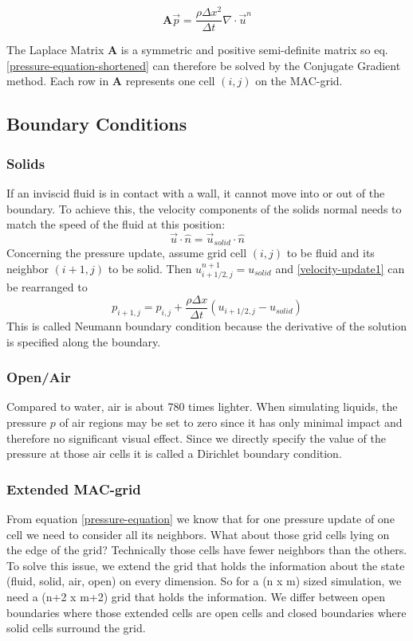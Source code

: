\begin{equation} \label{pressure-equation-shortened}
	\mathbf{A}\vec{p} = \frac{\rho \Delta x^2}{\Delta t}\nabla \cdot \vec{u}^n
\end{equation}

The Laplace Matrix $\mathbf{A}$ is a symmetric and positive semi-definite matrix so eq. \ref{pressure-equation-shortened} can therefore be solved by the Conjugate Gradient method. Each row in \textbf{A} represents one cell $(i, j)$ on the MAC-grid. 


\subsection{Boundary Conditions}
\subsubsection{Solids}
If an inviscid fluid is in contact with a wall, it cannot move into or out of the boundary. To achieve this, the velocity components of the solids normal needs to match the speed of the fluid at this position:
\begin{equation} \label{solid-velocity}
    \vec{u} \cdot \hat{n} = \vec{u}_{solid} \cdot \hat{n}
\end{equation}
Concerning the pressure update, assume grid cell $(i,j)$ to be fluid and its neighbor $(i+1,j)$ to be solid. Then $u_{i+1/2,j}^{n+1} = u_{solid}$ and \ref{velocity-update1} can be rearranged to 
\begin{equation} \label{solid-pressure-update}
    p_{i+1,j} = p_{i,j} + \frac{\rho \Delta x}{\Delta t} (u_{i+1/2,j} - u_{solid})
\end{equation}
This is called Neumann boundary condition because the derivative of the solution is specified along the boundary.
\newpage
\subsubsection{Open/Air} \label{dirichlet}
Compared to water, air is about 780 times lighter. When simulating liquids, the pressure $p$ of air regions may be set to zero since it has only minimal impact and therefore no significant visual effect. Since we directly specify the value of the pressure at those air cells it is called a Dirichlet boundary condition.


\subsubsection{Extended MAC-grid}
From equation \ref{pressure-equation} we know that for one pressure update of one cell we need to consider all its neighbors. What about those grid cells lying on the edge of the grid? Technically those cells have fewer neighbors than the others. To solve this issue, we extend the grid that holds the information about the state (fluid, solid, air, open) on every dimension. So for a (n x m) sized simulation, we need a (n+2 x m+2) grid that holds the information. We differ between open boundaries where those extended cells are open cells and closed boundaries where solid cells surround the grid.

